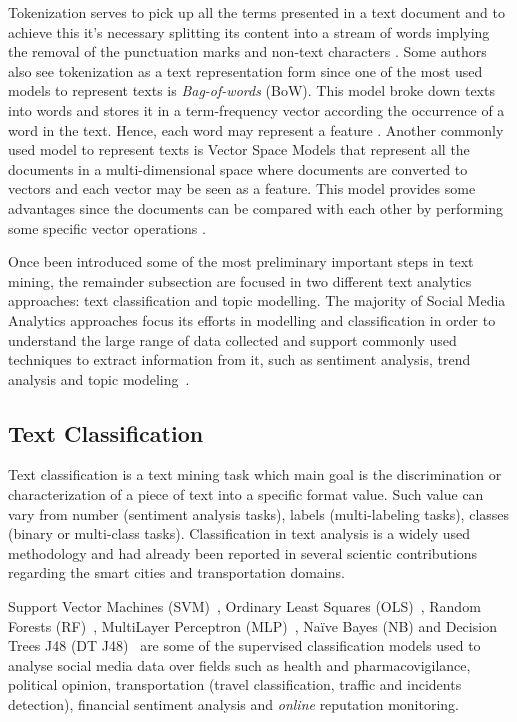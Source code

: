Tokenization serves to pick up all the terms presented in a text document and to achieve this it's necessary splitting its content into a stream of words implying the removal of the punctuation marks and non-text characters \cite{kn:Hotho2005}. Some authors also see tokenization as a text representation form since one of the most used models to represent texts is \textit{Bag-of-words} (BoW). This model broke down texts into words and stores it in a term-frequency vector according the occurrence of a word in the text. Hence, each word may represent a feature \cite{kn:Sriram2010}. Another commonly used model to represent texts is Vector Space Models that represent all the documents in a multi-dimensional space where documents are converted to vectors and each vector may be seen as a feature. This model provides some advantages since the documents can be compared with each other by performing some specific vector operations \cite{kn:Hotho2005}.

Once been introduced some of the most preliminary important steps in text mining, the remainder subsection are focused in two different text analytics approaches: text classification and topic modelling. The majority of Social Media Analytics approaches focus its efforts in modelling and classification in order to understand the large range of data collected and support commonly used techniques to extract information from it, such as sentiment analysis, trend analysis and topic modeling~\cite{kn:Fan2013}.

\subsection{Text Classification}

Text classification is a text mining task which main goal is the discrimination or characterization of a piece of text into a specific format value. Such value can vary from number (sentiment analysis tasks), labels (multi-labeling tasks), classes (binary or multi-class tasks). Classification in text analysis is a widely used methodology and had already been reported in several scientic contributions regarding the smart cities and transportation domains.

Support Vector Machines (SVM)~\cite{signorini2011use, zhang2016mining, pereira2017transportation, carvalho2010real}, Ordinary Least Squares (OLS)~\cite{saleiro2016sentiment}, Random Forests (RF)~\cite{saleiro2017feup}, MultiLayer Perceptron (MLP)~\cite{saleiro2017texrep}, Naïve Bayes (NB) and Decision Trees J48 (DT J48)~\cite{kuflik2017automating} are some of the supervised classification models used to analyse social media data over fields such as health and pharmacovigilance, political opinion, transportation (travel classification, traffic and incidents detection), financial sentiment analysis and \textit{online} reputation monitoring.

